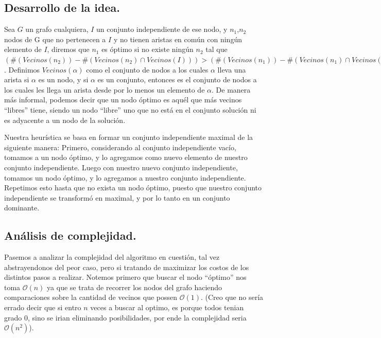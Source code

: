 \subsection{Desarrollo de la idea.}

\vspace*{0.3cm}

Sea $G$ un grafo cualquiera, $I$ un conjunto independiente de ese nodo, y $n_{1}$,$n_{2}$ nodos de G que no pertenecen a $I$ y no tienen aristas en común con ningún elemento de $I$, diremos que $n_{1}$ es óptimo si no existe ningún $n_{2}$ tal que $( \# (Vecinos(n_{2})) - \# (Vecinos(n_{2}) \cap Vecinos(I))) > ( \# (Vecinos(n_{1})) - \# (Vecinos(n_{1}) \cap Vecinos(I)))$. Definimos $Vecinos(\alpha)$ como el conjunto de nodos a los cuales $\alpha$ lleva una arista si $\alpha$ es un nodo, y si $\alpha$ es un conjunto, entonces es el conjunto de nodos a los cuales les llega un arista desde por lo menos un elemento de $\alpha$.  De manera más informal, podemos decir que un nodo óptimo es aquél que más vecinos ``libres'' tiene, siendo un nodo ``libre'' uno que no está en el conjunto solución ni es adyacente a un nodo de la solución.

Nuestra heurística se basa en formar un conjunto independiente maximal de la siguiente manera:
Primero, considerando al conjunto independiente vacío, tomamos a un nodo óptimo, y lo agregamos como nuevo elemento de nuestro conjunto independiente. Luego con nuestro nuevo conjunto independiente, tomamos un nodo óptimo, y lo agregamos a nuestro conjunto independiente. Repetimos esto hasta que no exista un nodo óptimo, puesto que nuestro conjunto independiente se transformó en maximal, y por lo tanto en un conjunto dominante.
 
\vspace*{0.6cm}


\subsection{Análisis de complejidad.}

\vspace*{0.3cm}

Pasemos a analizar la complejidad del algoritmo en cuestión, tal vez abstrayendonos del peor caso, pero si tratando de maximizar los costos de los distintos pasos a realizar. Notemos primero que buscar el nodo ``óptimo'' nos toma $\mathcal{O}(n)$ ya que se trata de recorrer los nodos del grafo haciendo comparaciones sobre la cantidad de vecinos que possen $\mathcal{O}(1)$. (Creo que no sería errado decir que si entro $n$ veces a buscar al optimo, es porque todos tenian grado 0, sino se irian eliminando posibilidades, por ende la complejidad seria $\mathcal{O}(n^2)$).


